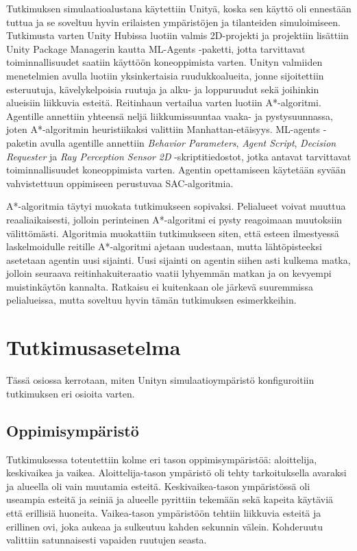 \documentclass[utf8]{gradu3}
\begin{document}
Tutkimuksen simulaatioalustana käytettiin Unityä, koska sen käyttö oli ennestään tuttua ja se soveltuu hyvin erilaisten ympäristöjen ja tilanteiden simuloimiseen. Tutkimusta varten Unity Hubissa luotiin valmis 2D-projekti ja projektiin lisättiin Unity Package Managerin kautta ML-Agents -paketti, jotta tarvittavat toiminnallisuudet saatiin käyttöön koneoppimista varten. Unityn valmiiden menetelmien avulla luotiin yksinkertaisia ruudukkoalueita, jonne sijoitettiin esteruutuja, kävelykelpoisia ruutuja ja alku- ja loppuruudut sekä joihinkin alueisiin liikkuvia esteitä. Reitinhaun vertailua varten luotiin A*-algoritmi. Agentille annettiin yhteensä neljä liikkumissuuntaa vaaka- ja pystysuunnassa, joten A*-algoritmin heuristiikaksi valittiin Manhattan-etäisyys. ML-agents -paketin avulla agentille annettiin \textit{Behavior Parameters}, \textit{Agent Script}, \textit{Decision Requester} ja \textit{Ray Perception Sensor 2D} -skriptitiedostot, jotka antavat tarvittavat toiminnallisuudet koneoppimista varten. Agentin opettamiseen käytetään syvään vahvistettuun oppimiseen perustuvaa SAC-algoritmia.

A*-algoritmia täytyi muokata tutkimukseen sopivaksi. Pelialueet voivat muuttua reaaliaikaisesti, jolloin perinteinen A*-algoritmi ei pysty reagoimaan muutoksiin välittömästi. Algoritmia muokattiin tutkimukseen siten, että esteen ilmestyessä laskelmoidulle reitille A*-algoritmi ajetaan uudestaan, mutta lähtöpisteeksi asetetaan agentin uusi sijainti. Uusi sijainti on agentin siihen asti kulkema matka, jolloin seuraava reitinhakuiteraatio vaatii lyhyemmän matkan ja on kevyempi muistinkäytön kannalta. Ratkaisu ei kuitenkaan ole järkevä suuremmissa pelialueissa, mutta soveltuu hyvin tämän tutkimuksen esimerkkeihin.

\section{Tutkimusasetelma}
\label{sec:tutkimusasetelma}

Tässä osiossa kerrotaan, miten Unityn simulaatioympäristö konfiguroitiin tutkimuksen eri osioita varten.

\subsection{Oppimisympäristö}

Tutkimuksessa toteutettiin kolme eri tason oppimisympäristöä: aloittelija, keskivaikea ja vaikea. Aloittelija-tason ympäristö oli tehty tarkoituksella avaraksi ja alueella oli vain muutamia esteitä. Keskivaikea-tason ympäristössä oli useampia esteitä ja seiniä ja alueelle pyrittiin tekemään sekä kapeita käytäviä että erillisiä huoneita. Vaikea-tason ympäristöön tehtiin liikkuvia esteitä ja erillinen ovi, joka aukeaa ja sulkeutuu kahden sekunnin välein. Kohderuutu valittiin satunnaisesti vapaiden ruutujen seasta.
\end{document}
